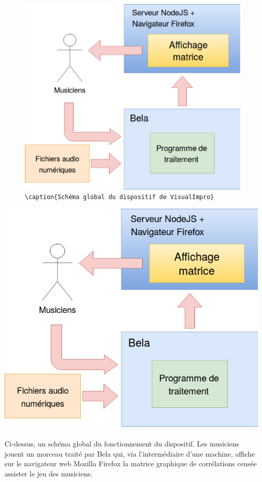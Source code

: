 \begin{figure}[h]
    \centering
    \includegraphics[scale=0.5]{schemaglobal.png}
    \verb!\caption{Schéma global du dispositif de VisualImpro}!
    \label{schéma global}
  \end{figure}
\includegraphics[scale=1]{schemaglobal.png}

\paragraph{}
Ci-dessus, un schéma global du fonctionnement du dispositif. Les
musiciens jouent un morceau traité par Bela qui, via l'intermédiaire
d'une machine, affiche sur le navigateur web Mozilla Firefox la
matrice graphique de corrélations censée assister le jeu des
musiciens.

